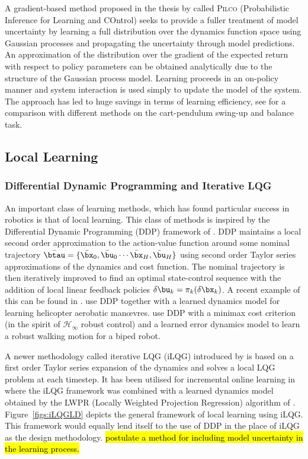 A gradient-based method proposed in the thesis by \cite{Dei09} called \textsc{Pilco} (Probabilistic Inference for Learning and COntrol) seeks to provide a fuller treatment of model uncertainty by learning a full distribution over the dynamics function space using Gaussian processes and propagating the uncertainty through model predictions. An approximation of the distribution over the gradient of the expected return with respect to policy parameters can be obtained analytically due to the structure of the Gaussian process model. Learning proceeds in an on-policy manner and system interaction is used simply to update the model of the system. The approach has led to huge savings in terms of learning efficiency, see \cite{DR11} for a comparison with different methods on the cart-pendulum swing-up and balance task.








\subsection{Local Learning} %



\subsubsection{Differential Dynamic Programming and Iterative LQG}
An important class of learning methods, which has found particular success in robotics is that of local learning. This class of methods is inspired by the Differential Dynamic Programming (DDP) framework of \cite{JaMa70}. DDP maintains a local second order approximation to the action-value function around some nominal trajectory $\bar\btau=\{\bar\bx_0, \bar\bu_0 \cdots \bar\bx_H, \bar\bu_H\}$ using second order Taylor series approximations of the dynamics and cost function. The nominal trajectory is then iteratively improved to find an optimal state-control sequence with the addition of local linear feedback policies $\delta\bu_k = \pi_k(\delta\bx_k)$. A recent example of this can be found in \cite{TT09}. \cite{ACQN07} use DDP together with a learned dynamics model for learning helicopter aerobatic man{\oe}vres. \cite{MZA02} use DDP with a minimax cost criterion (in the spirit of $\mathcal{H}_\infty$ robust control) and a learned error dynamics model to learn a robust walking motion for a biped robot.

A newer methodology called iterative LQG (iLQG) introduced by \cite{TL05} is based on a first order Taylor series expansion of the dynamics and solves a local LQG problem at each timestep. It has been utilised for incremental online learning in \cite{MKV10} where the iLQG framework was combined with a learned dynamics model obtained by the LWPR (Locally Weighted Projection Regression) algorithm of \cite{VDS05}. Figure~\ref{figs:iLQGLD} depicts the general framework of local learning using iLQG. This framework would equally lend itself to the use of DDP in the place of iLQG as the design methodology. \cite{MKOKV10} \hl{postulate a method for including model uncertainty in the learning process.}

